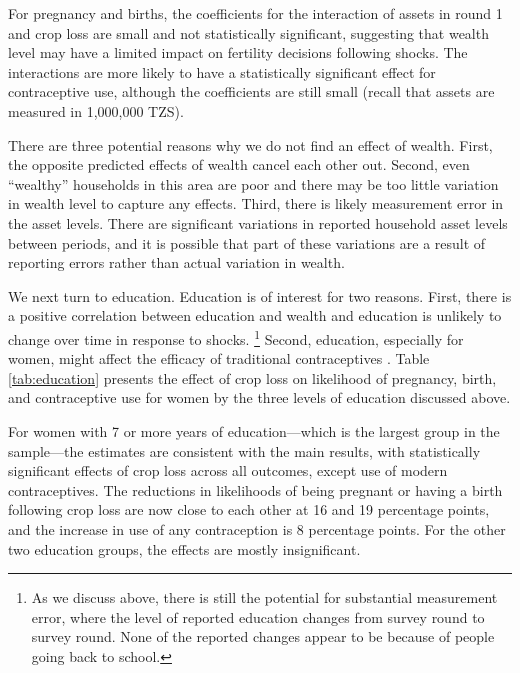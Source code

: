 \documentclass[letterpaper,12pt]{article}
\begin{document}
For pregnancy and births, the coefficients for the interaction of assets 
in round 1 and crop loss are small and not statistically significant,
suggesting that wealth level may have a limited impact on fertility
decisions following shocks. 
The interactions are more likely to have a statistically significant
effect for contraceptive use, although the coefficients are still
small (recall that assets are measured in 1,000,000 TZS).

There are three potential reasons why we do not find an effect of wealth.
First, the opposite predicted effects of wealth cancel each other out.
Second, even ``wealthy'' households in this area are  poor and
there may be too little variation in wealth level to capture any effects.
Third, there is likely measurement error in the asset levels. 
There are significant variations in reported household asset levels between 
periods, and it is possible that part of these variations are a result of 
reporting errors rather than actual variation in wealth.



We next turn to education.
Education is of interest for two reasons.
First, there is a positive correlation between education and wealth and 
education is unlikely to change over time in response to shocks.%
\footnote{
As we discuss above, there is still the potential for substantial
measurement error, where the level of reported education changes
from survey round to survey round.
None of the reported changes appear to be because of people going 
back to school.
}
Second, education, especially for women, might affect the efficacy of 
traditional contraceptives \citep{Rosenzweig1989}.
Table \ref{tab:education} presents the effect of crop loss on
likelihood of pregnancy, birth, and contraceptive use for women
by the three levels of education discussed above.




For women with 7 or more years of education---which is the largest
group in the sample---the estimates are consistent with the 
main results, with statistically significant effects of crop loss 
across all outcomes, except use of modern contraceptives.
The reductions in likelihoods of being pregnant or having a birth
following crop loss are now close to each other at 16 and 19 percentage
points, and the increase in use of any contraception is 8 percentage
points.
For the other two education groups, the effects are mostly insignificant.
\end{document}
